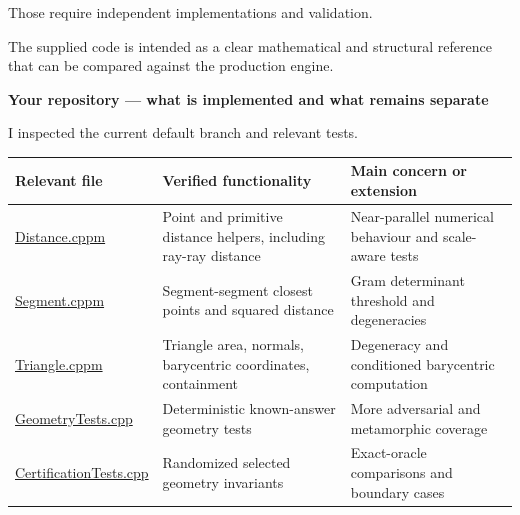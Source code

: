 Those require independent implementations and validation.

The supplied code is intended as a clear mathematical and structural reference that can be compared against the production engine.

\textbf{Your repository --- what is implemented and what remains separate}

I inspected the current  default branch and relevant tests.

{\def\LTcaptype{none} %
\begin{longtable}[]{@{}
  >{\raggedright\arraybackslash}p{}
  >{\raggedright\arraybackslash}p{}
  >{\raggedright\arraybackslash}p{}@{}}
\toprule\noalign{}
\begin{minipage}[b]{\linewidth}\raggedright
Relevant file
\end{minipage} & \begin{minipage}[b]{\linewidth}\raggedright
Verified functionality
\end{minipage} & \begin{minipage}[b]{\linewidth}\raggedright
Main concern or extension
\end{minipage} \\
\midrule\noalign{}
\endhead
\bottomrule\noalign{}
\endlastfoot
\href{https://github.com/swayam8624/KairoGeometry/blob/master/Distance.cppm?utm_source=chatgpt.com}{Distance.cppm} & Point and primitive distance helpers, including ray-ray distance & Near-parallel numerical behaviour and scale-aware tests \\
\href{https://github.com/swayam8624/KairoGeometry/blob/master/Segment.cppm?utm_source=chatgpt.com}{Segment.cppm} & Segment-segment closest points and squared distance & Gram determinant threshold and degeneracies \\
\href{https://github.com/swayam8624/KairoGeometry/blob/master/Triangle.cppm?utm_source=chatgpt.com}{Triangle.cppm} & Triangle area, normals, barycentric coordinates, containment & Degeneracy and conditioned barycentric computation \\
\href{https://github.com/swayam8624/KairoGeometry/blob/master/tests/GeometryTests.cpp?utm_source=chatgpt.com}{GeometryTests.cpp} & Deterministic known-answer geometry tests & More adversarial and metamorphic coverage \\
\href{https://github.com/swayam8624/KairoGeometry/blob/master/tests/CertificationTests.cpp?utm_source=chatgpt.com}{CertificationTests.cpp} & Randomized selected geometry invariants & Exact-oracle comparisons and boundary cases \\
\end{longtable}
}

